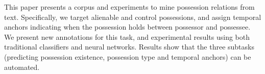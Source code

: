 This paper presents a corpus and experiments to mine possession relations from text. Specifically, we target alienable and control possessions, and assign temporal anchors indicating when the possession holds between possessor and possessee. We present new annotations for this task, and experimental results using both traditional classifiers and neural networks. Results show that the three subtasks (predicting possession existence, possession type and temporal anchors) can be automated.
